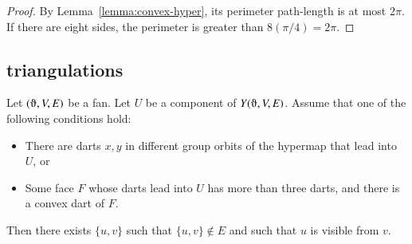 \begin{proof} By Lemma~\ref{lemma:convex-hyper},
 its perimeter path-length is at
most $2\pi$.  If there are eight sides, the perimeter
is greater than $8 (\pi/4) =2\pi$.
\end{proof}




\subsection{triangulations}




\begin{lemma} Let $(\orgn,V,E)$ be a fan.  Let $U$ be a component of $Y(\orgn,V,E)$.
Assume that one of the following conditions hold:
\begin{itemize} 
  \item There are darts $x,y$ in different group orbits  of the 
   hypermap that lead into $U$, or
  \item Some face $F$ whose darts lead into $U$ 
has more than three darts, and there is a convex dart of $F$.
\end{itemize}
Then there exists $\{u,v\}$ such that $\{u,v\}\not\in E$ and such
that $u$ is visible from $v$.
\end{lemma}


